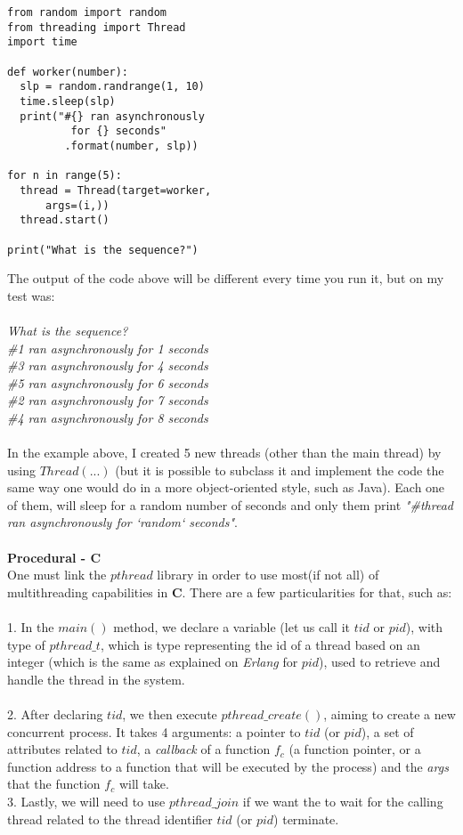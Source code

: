 \documentclass[conference]{IEEEtran}
\begin{document}
\lstset{language=python}
\begin{lstlisting}[frame=single]
from random import random
from threading import Thread
import time

def worker(number):
  slp = random.randrange(1, 10)
  time.sleep(slp)
  print("#{} ran asynchronously
          for {} seconds"
         .format(number, slp))

for n in range(5):
  thread = Thread(target=worker,
      args=(i,))
  thread.start()

print("What is the sequence?")
\end{lstlisting}

The output of the code above will be different every time you run it, but on my test was:
\\\\
\textit{What is the sequence?}\\
\textit{\#1 ran asynchronously for 1 seconds}\\
\textit{\#3 ran asynchronously for 4 seconds}\\
\textit{\#5 ran asynchronously for 6 seconds}\\
\textit{\#2 ran asynchronously for 7 seconds}\\
\textit{\#4 ran asynchronously for 8 seconds}
\\\\
In the example above, I created 5 new threads (other than the main thread) by using $Thread(...)$ (but it is possible to subclass it and implement the code the same way one would do in a more object-oriented style, such as Java). Each one of them, will sleep for a random number of seconds and only them print \textit{"\#thread ran asynchronously for `random` seconds"}.
\\\\
\textbf{ Procedural - C }
\\One must link the $pthread$ library in order to use most(if not all) of multithreading capabilities in \textbf{C}. There are a few particularities for that, such as:
\\\\
1. In the $main()$ method, we declare a variable (let us call it $tid$ or $pid$), with type of $pthread\_t$, which is type representing the id of a thread based on an integer (which is the same as explained on \textit{Erlang} for $pid$), used to retrieve and handle the thread in the system.
\\\\
2. After declaring $tid$, we then execute $pthread\_create()$, aiming to create a new concurrent process. It takes 4 arguments: a pointer to $tid$ (or $pid$), a set of attributes related to $tid$, a \textit{callback} of a function  $f_c$ (a function pointer, or a function address to a function that will be executed by the process) and the \textit{args} that the function $f_c$ will take.\\
3. Lastly, we will need to use $pthread\_join$ if we want the to wait for the calling thread related to the thread identifier $tid$ (or $pid$) terminate.
\end{document}
